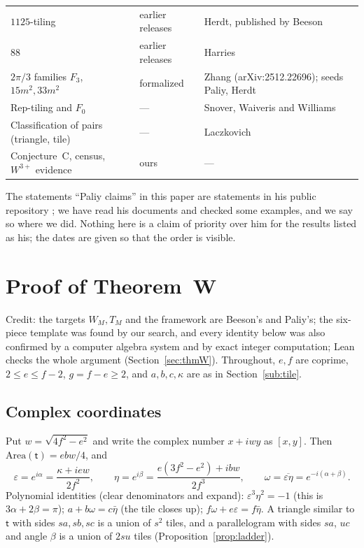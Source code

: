 \documentclass[11pt,reqno]{amsart}
\theoremstyle{plain}
\theoremstyle{definition}
\newcommand{\tile}{\mathsf{t}}
\begin{document}
\begin{center}
\begin{tabular}{@{}p{4.4cm}p{1.8cm}p{6.4cm}@{}}
$1125$-tiling & earlier releases & Herdt, published by Beeson\\
$88$ & earlier releases & Harries\\
$2\pi/3$ families $F_3$, $15m^2,33m^2$ & formalized & Zhang (arXiv:2512.22696); seeds Paliy, Herdt\\
Rep-tiling and $F_0$ & --- & Snover, Waiveris and Williams\\
Classification of pairs (triangle, tile) & --- & Laczkovich\\
Conjecture~C, census, $W^{3+}$ evidence & ours & ---\\
\bottomrule
\end{tabular}
\end{center}
The statements ``Paliy claims'' in this paper are statements in his public repository \cite{PaliyRepo}; we have read his documents and checked some examples, and we say so where we did. Nothing here is a claim of priority over him for the results listed as his; the dates are given so that the order is visible.


\appendix
\section{Proof of Theorem~W}\label{app:W}

Credit: the targets $W_M,T_M$ and the framework are Beeson's and Paliy's; the six-piece template was found by our search, and every identity below was also confirmed by a computer algebra system and by exact integer computation; Lean checks the whole argument (Section~\ref{sec:thmW}).
Throughout, $e,f$ are coprime, $2\le e\le f-2$, $g=f-e\ge2$, and $a,b,c,\kappa$ are as in Section~\ref{sub:tile}.

\subsection{Complex coordinates}
Put $w=\sqrt{4f^2-e^2}$ and write the complex number $x+iwy$ as $[x,y]$. Then $\mathrm{Area}(\tile)=ebw/4$, and
\[
\varepsilon=e^{i\alpha}=\frac{\kappa+iew}{2f^2},\qquad \eta=e^{i\beta}=\frac{e(3f^2-e^2)+ibw}{2f^3},\qquad \omega=\overline{\varepsilon\eta}=e^{-i(\alpha+\beta)} .
\]
Polynomial identities (clear denominators and expand): $\varepsilon^3\eta^2=-1$ (this is $3\alpha+2\beta=\pi$); $a+b\omega=c\bar\eta$ (the tile closes up); $f\omega+e\varepsilon=f\bar\eta$.
A triangle similar to $\tile$ with sides $sa,sb,sc$ is a union of $s^2$ tiles, and a parallelogram with sides $sa$, $uc$ and angle $\beta$ is a union of $2su$ tiles (Proposition~\ref{prop:ladder}).
\end{document}

